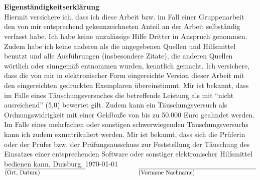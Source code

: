 
\

\cleardoublepage

\


\pagestyle{empty}

\textbf{Eigenständigkeitserklärung}\\

Hiermit versichere ich, dass ich diese Arbeit bzw. im Fall einer Gruppenarbeit
den von mir entsprechend gekennzeichneten Anteil an der Arbeit selbständig verfasst habe.
Ich habe keine unzulässige Hilfe Dritter in Anspruch genommen. Zudem habe ich keine
anderen als die angegebenen Quellen und Hilfsmittel benutzt und alle Ausführungen
(insbesondere Zitate), die anderen Quellen wörtlich oder sinngemäß entnommen wurden,
kenntlich gemacht.
Ich versichere, dass die von mir in elektronischer Form eingereichte Version dieser Arbeit mit
den eingereichten gedruckten Exemplaren übereinstimmt.
Mir ist bekannt, dass im Falle eines Täuschungsversuches die betreffende Leistung als mit
“nicht ausreichend” (5,0) bewertet gilt. Zudem kann ein Täuschungsversuch als
Ordnungswidrigkeit mit einer Geldbuße von bis zu 50.000 Euro geahndet werden. Im Falle
eines mehrfachen oder sonstigen schwerwiegenden Täuschungsversuchs kann ich zudem
exmatrikuliert werden.
Mir ist bekannt, dass sich die Prüferin oder der Prüfer bzw. der Prüfungsausschuss zur
Feststellung der Täuschung des Einsatzes einer entsprechenden Software oder sonstiger
elektronischer Hilfsmittel bedienen kann.
\vfill
Duisburg, \today\\
$\overline{\parbox{4.8cm}{(Ort, Datum)}} ~~~~~~~~~~~~~~~~~~~~~~~~~~~ \overline{\parbox{7cm}{(Vorname Nachname)}}$
